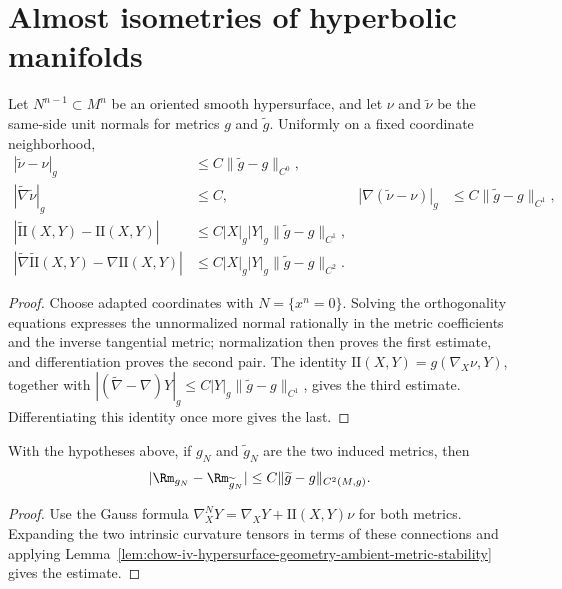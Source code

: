 \section{Almost isometries of hyperbolic manifolds}

\begin{lemma}
\label{lem:chow-iv-hypersurface-geometry-ambient-metric-stability}
Let \(N^{n-1}\subset M^n\) be an oriented smooth hypersurface, and let \(\nu\)
and \(\widetilde\nu\) be the same-side unit normals for metrics \(g\) and
\(\widetilde g\).  Uniformly on a fixed coordinate neighborhood,
\begin{align*}
 |\widetilde\nu-\nu|_g&\le C\|\widetilde g-g\|_{C^0},\\
 |\widetilde\nabla\widetilde\nu|_g&\le C,
 &|\nabla(\widetilde\nu-\nu)|_g&\le C\|\widetilde g-g\|_{C^1},\\
 |\widetilde{\mathrm{II}}(X,Y)-\mathrm{II}(X,Y)|
 &\le C|X|_g|Y|_g\|\widetilde g-g\|_{C^1},\\
 |\widetilde\nabla\widetilde{\mathrm{II}}(X,Y)-\nabla\mathrm{II}(X,Y)|
 &\le C|X|_g|Y|_g\|\widetilde g-g\|_{C^2}.
\end{align*}
\end{lemma}
\begin{proof}
\sketch
Choose adapted coordinates with \(N=\{x^n=0\}\).  Solving the orthogonality
equations expresses the unnormalized normal rationally in the metric
coefficients and the inverse tangential metric; normalization then proves the
first estimate, and differentiation proves the second pair.  The identity
\(\mathrm{II}(X,Y)=g(\nabla_X\nu,Y)\), together with
\(|(\widetilde\nabla-\nabla)Y|_g\le C|Y|_g\|\widetilde g-g\|_{C^1}\), gives
the third estimate.  Differentiating this identity once more gives the last.
\end{proof}

\begin{lemma}
\label{lem:chow-iv-hypersurface-intrinsic-curvature-stability}
With the hypotheses above, if \(g_N\) and \(\widetilde g_N\) are the two induced
metrics, then
\[
 |\Rm_{g_N}-\Rm_{\widetilde g_N}|
 \le C\|\widetilde g-g\|_{C^2(M,g)}.
\]
\end{lemma}
\begin{proof}
\sketch
Use the Gauss formula
\(\nabla^N_XY=\nabla_XY+\mathrm{II}(X,Y)\nu\) for both metrics.  Expanding the
two intrinsic curvature tensors in terms of these connections and applying
Lemma~\ref{lem:chow-iv-hypersurface-geometry-ambient-metric-stability} gives
the estimate.
\end{proof}

